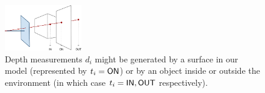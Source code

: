 \begin{figure}[tb]
  \centering \includegraphics[width=0.3\textwidth]{figures/point-projs}
  \caption{Depth measurements $d_i$ might be generated by a surface in
    our model (represented by $t_i=\textsf{ON}$) or by an object inside or
    outside the environment (in which case $t_i=\textsf{IN},\textsf{OUT}$
    respectively).}
  \label{fig:point-projs}
\end{figure}



